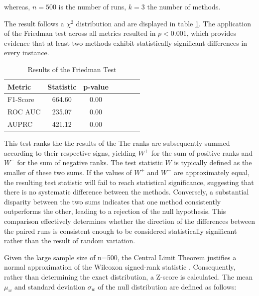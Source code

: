 whereas, $n = 500$ is the number of runs, $k = 3$ the number of methods. 


The result follows a $\chi^2$ distribution and are displayed in table \ref{tab:friedman}.
The application of the Friedman test across all metrics resulted in $p < 0.001$, which provides evidence that at least two methods exhibit statistically significant differences in every instance. 

\begin{table}[h]
\centering
\caption{Results of the Friedman Test}
\label{tab:friedman}
\begin{tabular}{lcccccc} 
\toprule
\textbf{Metric}         & \textbf{Statistic}    & \textbf{p-value}  &    \\
\midrule
F1-Score                & 664.60                & 0.00              &    \\
ROC AUC                 & 235.07                & 0.00              &    \\
AUPRC                   & 421.12                & 0.00              &    \\
\bottomrule
\end{tabular}
\end{table}



This test ranks the the results of the 
The ranks are subsequently summed according to their respective signs, yielding $W^+$ for the sum of positive ranks and $W^-$ for the sum of negative ranks. 
The test statistic $W$ is typically defined as the smaller of these two sums. 
If the values of $W^+$ and $W^-$ are approximately equal, the resulting test statistic will fail to reach statistical significance, suggesting that there is no systematic difference between the methods. 
Conversely, a substantial disparity between the two sums indicates that one method consistently outperforms the other, leading to a rejection of the null hypothesis. 
This comparison effectively determines whether the direction of the differences between the paired runs is consistent enough to be considered statistically significant rather than the result of random variation.


Given the large sample size of n=500, the Central Limit Theorem justifies a normal approximation of the Wilcoxon signed-rank statistic \citep{wilcoxon1945individual}. 
Consequently, rather than determining the exact distribution, a Z-score is calculated. 
The mean $\mu_w$ and standard deviation $\sigma_w$ of the null distribution are defined as follows:

